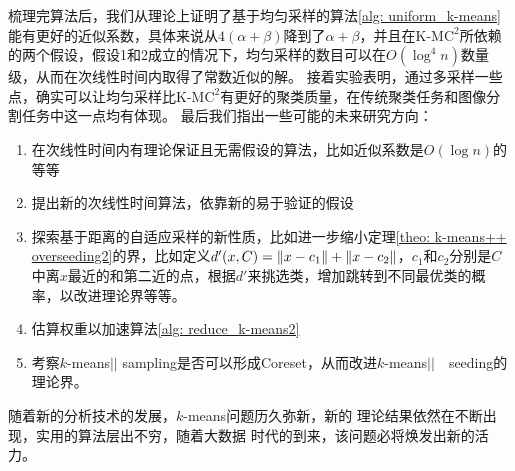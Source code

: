 梳理完算法后，我们从理论上证明了基于均匀采样的算法\ref{alg: uniform_k-means}能有更好的近似系数，具体来说从$4(\alpha+\beta)$降到了$\alpha+\beta$，并且在K-M$\text{C}^2$所依赖的两个假设，假设1和2成立的情况下，均匀采样的数目可以在$O(\log^4 n)$数量级，从而在次线性时间内取得了常数近似的解。
接着实验表明，通过多采样一些点，确实可以让均匀采样比K-M$\text{C}^2$有更好的聚类质量，在传统聚类任务和图像分割任务中这一点均有体现。
最后我们指出一些可能的未来研究方向：
\begin{enumerate}[label=\arabic*)]
	\item 在次线性时间内有理论保证且无需假设的算法，比如近似系数是$O(\log n)$的等等
	\item 提出新的次线性时间算法，依靠新的易于验证的假设
	\item 探索基于距离的自适应采样的新性质，比如进一步缩小定理\ref{theo: k-means++ overseeding2}的界，比如定义$d'(x,C) = \left\lVert x - c_1\right\rVert+\left\lVert x-c_2\right\rVert$，$c_1$和$c_2$分别是$C$中离$x$最近的和第二近的点，根据$d'$来挑选类，增加跳转到不同最优类的概率，以改进理论界等等。
	\item 估算权重以加速算法\ref{alg: reduce_k-means2}
	\item 考察$k$-means\(\vert \vert\) sampling是否可以形成Coreset，从而改进$k$-means\(\vert \vert\)　seeding的理论界。
\end{enumerate}
随着新的分析技术的发展，$k$-means问题历久弥新，新的
理论结果依然在不断出现，实用的算法层出不穷，随着大数据
时代的到来，该问题必将焕发出新的活力。
